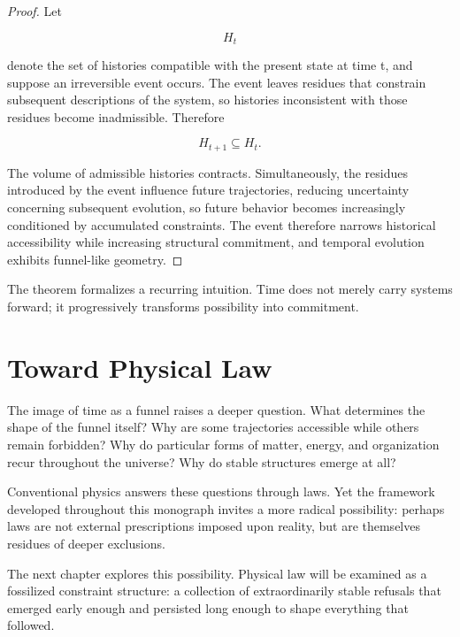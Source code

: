 \documentclass[11pt,oneside]{book}
\theoremstyle{plain}
\theoremstyle{definition}
\theoremstyle{remark}
\begin{document}
\begin{proof}
Let

\begin{equation}
H_t
\end{equation}

denote the set of histories compatible with the present state at time t, and suppose an irreversible event occurs. The event leaves residues that constrain subsequent descriptions of the system, so histories inconsistent with those residues become inadmissible. Therefore

\begin{equation}
H_{t+1}
\subseteq
H_t.
\end{equation}

The volume of admissible histories contracts. Simultaneously, the residues introduced by the event influence future trajectories, reducing uncertainty concerning subsequent evolution, so future behavior becomes increasingly conditioned by accumulated constraints. The event therefore narrows historical accessibility while increasing structural commitment, and temporal evolution exhibits funnel-like geometry.
\end{proof}

The theorem formalizes a recurring intuition. Time does not merely carry systems forward; it progressively transforms possibility into commitment.

\section{Toward Physical Law}

The image of time as a funnel raises a deeper question. What determines the shape of the funnel itself? Why are some trajectories accessible while others remain forbidden? Why do particular forms of matter, energy, and organization recur throughout the universe? Why do stable structures emerge at all?

Conventional physics answers these questions through laws. Yet the framework developed throughout this monograph invites a more radical possibility: perhaps laws are not external prescriptions imposed upon reality, but are themselves residues of deeper exclusions.

The next chapter explores this possibility. Physical law will be examined as a fossilized constraint structure: a collection of extraordinarily stable refusals that emerged early enough and persisted long enough to shape everything that followed.
\end{document}
